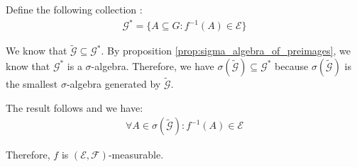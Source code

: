 \begin{proof*}
    Define the following collection :
    \begin{align*}
        \mathcal{G}^* = \Big\{
            A \subseteq G : f^{-1}(A) \in \mathcal{E}
        \Big\}
    \end{align*}

    \noindent We know that $\mathcal{\tilde G} \subseteq \mathcal{G}^*$. By proposition \ref{prop:sigma_algebra_of_preimages}, we know that $\mathcal{G}^*$ is a $\sigma$-algebra. Therefore, we have $\sigma(\mathcal{\tilde G}) \subseteq \mathcal{G}^*$ because $\sigma(\mathcal{\tilde G})$ is the smallest $\sigma$-algebra generated by $\mathcal{\tilde G}$.

    \noindent\newline The result follows and we have:
    \begin{align*}
        \forall A \in \sigma(\mathcal{\tilde G}) : f^{-1}(A) \in \mathcal{E}
    \end{align*}

    \noindent Therefore, $f$ is $(\mathcal{E}, \mathcal{F})$-measurable.
\end{proof*}

